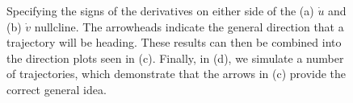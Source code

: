 \begin{figure}[!!!h!!!tbp]
\caption{\label{Derivative_signs}Specifying the signs of the derivatives on either side of the (a) $\dot{u}$ and (b) $\dot{v}$ nullcline. The arrowheads indicate the general direction that a trajectory will be heading. These results can then be combined into the direction plots seen in (c). Finally, in (d), we simulate a number of trajectories, which demonstrate that the arrows in (c) provide the correct general idea.}
\end{figure}


